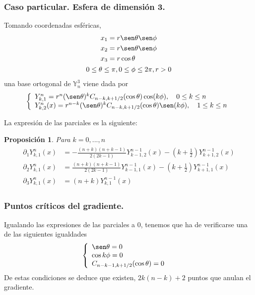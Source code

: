 \documentclass{beamer}
\theoremstyle{plain}
\theoremstyle{definition}
\theoremstyle{plain}
\newtheorem{prop}[thm]{Proposici\'{o}n}
\theoremstyle{definition}
\theoremstyle{remark}
\theoremstyle{definition}
\begin{document}
\begin{frame}
		\frametitle{Caso particular. Esfera de dimensión 3.}
		Tomando coordenadas esféricas,
		\begin{gather*}
		\begin{aligned}
		x_1 &= r \sen \theta \sen \phi\\
		x_2 &= r \sen \theta \sen \phi\\
		x_3 &= r \cos \theta\\
		\end{aligned}
		\\
		0\le \theta \le \pi,0\le\phi\le2\pi,r>0
		\end{gather*}
		una base ortogonal de $\mathds{Y}_n^3$ viene dada por
		\begin{equation*}
		\left\lbrace
		\begin{array}{ll}
		Y^n_ {k,1} = r^n(\sen \theta)^kC_{n-k,k+1/2}(\cos \theta) \cos(k\phi),\quad 0\le k\le n \\
		Y^n_{k,2}(x) = r^{n-k}(\sen\theta)^kC_{n-k,k+1/2}(\cos\theta)\sen(k\phi), \quad 1\le k\le n
		\end{array}
		\right.
		\end{equation*}
\end{frame}
\begin{frame}
La expresión de las parciales es la siguiente:
	\begin{prop} Para $k=0,...,n$
		\begin{gather*} 
		\begin{aligned}
		\partial_1Y^{n}_{k,1}(x) &= -\frac{(n+k)(n+k-1)}{2(2k-1)}Y^{n-1}_{k-1,2}(x)-(k+\frac{1}{2})Y^{n-1}_ {k+1,2}(x) \\
		\partial_2Y^{n}_{k,1}(x) &= \frac{(n+k)(n+k-1)}{2(2k-1)}Y^{n-1}_{k-1,1}(x)-(k+\frac{1}{2})Y^{n-1}_ {k+1,1}(x) \\
		\partial_3 Y_{k,1}^{n}(x) &=(n+k)Y_{k,1}^{n-1}(x)
		\end{aligned}
		\end{gather*}

	\end{prop}
\end{frame}
\begin{frame}
	\frametitle{Puntos críticos del gradiente.}

	Igualando las expresiones de las parciales a 0, tenemos que ha de verificarse una de las siguientes igualdades
	\begin{gather*}
	\left\{
	\begin{array}{ll}
	\sen \theta= 0 \\
	\cos k\phi = 0 &\\
	C_{n-k-1,k+1/2}(\cos \theta) = 0
	\end{array}
	\right.
	\end{gather*}
	De estas condiciones se deduce que existen, $2k(n-k)+2$ puntos que anulan el gradiente.
\end{frame}
\end{document}
